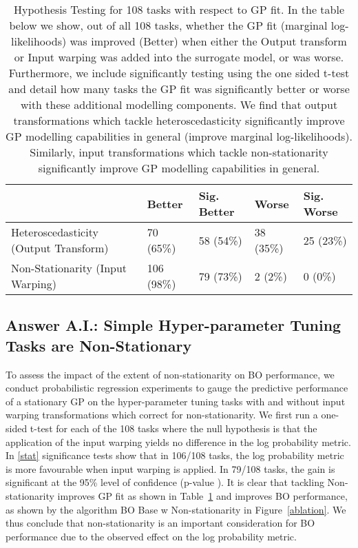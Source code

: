 \documentclass[jair,twoside,11pt,theapa]{article}
\theoremstyle{definition}
\begin{document}
\begin{table}[ht!]
\caption{Hypothesis Testing for 108 tasks with respect to GP fit. In the table below we show, out of all 108 tasks, whether the GP fit (marginal log-likelihoods) was improved (Better) when either the Output transform or Input warping was added into the surrogate model, or was worse. Furthermore, we include significantly testing using the one sided t-test and detail how many tasks the GP fit was significantly better or worse with these additional modelling components. We find that output transformations which tackle heteroscedasticity significantly improve GP modelling capabilities in general (improve marginal log-likelihoods). Similarly, input transformations which tackle non-stationarity significantly improve GP modelling capabilities in general.}
\centering
\begin{tabular}{lllll}
\hline
 & Better & Sig. Better & Worse & Sig. Worse \\ \hline
Heteroscedasticity (Output Transform) & 70 (65\%)  & 58 (54\%) & 38 (35\%) & 25 (23\%)\\
Non-Stationarity (Input Warping) & 106 (98\%) & 79 (73\%) & 2 (2\%) & 0 (0\%)
\end{tabular}
\label{stat}
\end{table}


\subsection{Answer A.I.: Simple Hyper-parameter Tuning Tasks are Non-Stationary} \label{Sec:nonStat}
To assess the impact of the extent of non-stationarity on BO performance, we conduct probabilistic regression experiments to gauge the predictive performance of a stationary GP on the hyper-parameter tuning tasks with and without input warping transformations which correct for non-stationarity. We first run a one-sided t-test for each of the 108 tasks where the null hypothesis is that the application of the input warping yields no difference in the log probability metric. In \autoref{stat} significance tests show that in 106/108 tasks, the log probability metric is more favourable when input warping is applied. In 79/108 tasks, the gain is significant at the 95\% level of confidence (p-value ). It is clear that tackling Non-stationarity improves GP fit as shown in Table~\ref{stat} and improves BO performance, as shown by the algorithm BO Base w Non-stationarity in Figure~\ref{ablation}. We thus conclude that non-stationarity is an important consideration for BO performance due to the observed effect on the log probability metric.
\end{document}
